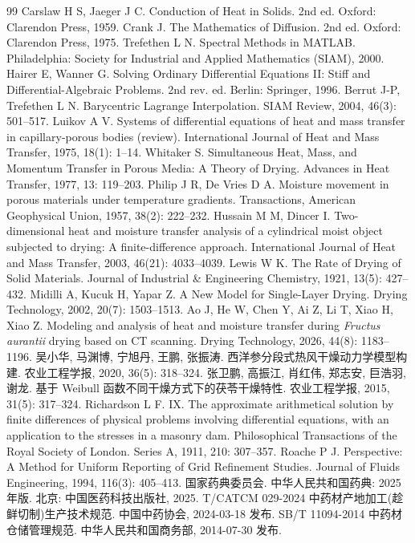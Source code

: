 \documentclass[withoutpreface,bwprint]{cumcmthesis}
\begin{document}
\begin{thebibliography}{99}
 Carslaw H S, Jaeger J C. Conduction of Heat in Solids. 2nd ed.
Oxford: Clarendon Press, 1959.
 Crank J. The Mathematics of Diffusion. 2nd ed.
Oxford: Clarendon Press, 1975.
 Trefethen L N. Spectral Methods in MATLAB.
Philadelphia: Society for Industrial and Applied Mathematics (SIAM), 2000.
 Hairer E, Wanner G. Solving Ordinary Differential Equations II:
Stiff and Differential-Algebraic Problems. 2nd rev. ed. Berlin: Springer, 1996.
 Berrut J-P, Trefethen L N. Barycentric Lagrange Interpolation.
SIAM Review, 2004, 46(3): 501--517.
 Luikov A V. Systems of differential equations of heat and mass transfer
in capillary-porous bodies (review). International Journal of Heat and Mass Transfer,
1975, 18(1): 1--14.
 Whitaker S. Simultaneous Heat, Mass, and Momentum Transfer in Porous
Media: A Theory of Drying. Advances in Heat Transfer, 1977, 13: 119--203.
 Philip J R, De Vries D A. Moisture movement in porous materials under
temperature gradients. Transactions, American Geophysical Union, 1957, 38(2): 222--232.
 Hussain M M, Dincer I. Two-dimensional heat and moisture transfer
analysis of a cylindrical moist object subjected to drying: A finite-difference approach.
International Journal of Heat and Mass Transfer, 2003, 46(21): 4033--4039.
 Lewis W K. The Rate of Drying of Solid Materials.
Journal of Industrial \& Engineering Chemistry, 1921, 13(5): 427--432.
 Midilli A, Kucuk H, Yapar Z. A New Model for Single-Layer Drying.
Drying Technology, 2002, 20(7): 1503--1513.
 Ao J, He W, Chen Y, Ai Z, Li T, Xiao H, Xiao Z. Modeling and analysis of
heat and moisture transfer during \emph{Fructus aurantii} drying based on CT scanning.
Drying Technology, 2026, 44(8): 1183--1196.
 吴小华, 马渊博, 宁旭丹, 王鹏, 张振涛. 西洋参分段式热风干燥动力学模型构建.
农业工程学报, 2020, 36(5): 318--324.
 张卫鹏, 高振江, 肖红伟, 郑志安, 巨浩羽, 谢龙.
基于 Weibull 函数不同干燥方式下的茯苓干燥特性. 农业工程学报, 2015, 31(5): 317--324.
 Richardson L F. IX. The approximate arithmetical solution by finite
differences of physical problems involving differential equations, with an application to
the stresses in a masonry dam. Philosophical Transactions of the Royal Society of London.
Series A, 1911, 210: 307--357.
 Roache P J. Perspective: A Method for Uniform Reporting of Grid
Refinement Studies. Journal of Fluids Engineering, 1994, 116(3): 405--413.
 国家药典委员会. 中华人民共和国药典: 2025 年版. 北京: 中国医药科技出版社, 2025.
 T/CATCM 029-2024 中药材产地加工(趁鲜切制)生产技术规范.
中国中药协会, 2024-03-18 发布.
 SB/T 11094-2014 中药材仓储管理规范. 中华人民共和国商务部, 2014-07-30 发布.
\end{thebibliography}
\end{document}
